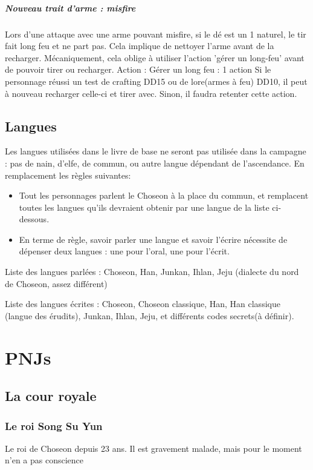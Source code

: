 \documentclass[10pt,a4paper]{book}
\begin{document}
\paragraph{Nouveau trait d'arme : misfire}
Lors d'une attaque avec une arme pouvant misfire, si le dé est un 1 naturel, le tir fait long feu et ne part pas. Cela implique de nettoyer l'arme avant de la recharger. Mécaniquement, cela oblige à utiliser l'action 'gérer un long-feu' avant de pouvoir tirer ou recharger.
Action :
Gérer un long feu : 1 action
Si le personnage réussi un test de crafting DD15 ou de lore(armes à feu) DD10, il peut à nouveau recharger celle-ci et tirer avec. Sinon, il faudra retenter cette action.

\section{Langues}

Les langues utilisées dans le livre de base ne seront pas utilisée dans la campagne : pas de nain, d'elfe, de commun, ou autre langue dépendant de l'ascendance.
En remplacement les règles suivantes:
\begin{itemize}
\item Tout les personnages parlent le Choseon à la place du commun, et remplacent toutes les langues qu'ils devraient obtenir par une langue de la liste ci-dessous.
\item En terme de règle, savoir parler une langue et savoir l'écrire nécessite de dépenser deux langues : une pour l'oral, une pour l'écrit. 
\end{itemize}


Liste des langues parlées : Choseon, Han, Junkan, Ihlan, Jeju (dialecte du nord de Choseon, assez différent)

Liste des langues écrites : Choseon, Choseon classique, Han, Han classique (langue des érudits), Junkan, Ihlan, Jeju, et différents codes secrets(à définir).

\chapter{PNJs}
\section{La cour royale}
\subsection{Le roi Song Su Yun}
Le roi de Choseon depuis 23 ans. Il est gravement malade, mais pour le moment n'en a pas conscience
\end{document}
